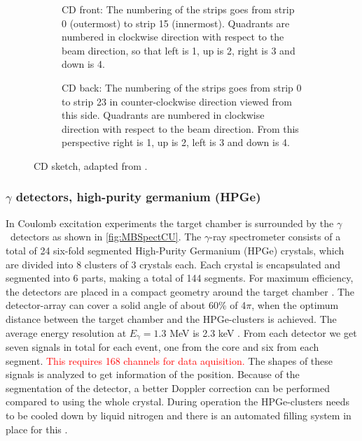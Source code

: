 \documentclass[twoside,english]{uiofysmaster/uiofysmaster}
\newcommand{\ga}{$\gamma$}
\begin{document}
\begin{figure}[ht]
	\centering
	\begin{subfigure}{\textwidth}
		
		\caption{CD front: The numbering of the strips goes from strip 0 (outermost) to strip 15 (innermost). Quadrants are numbered in clockwise direction with respect to the beam direction, so that left is 1, up is 2, right is 3 and down is 4.}
		\label{fig:CD-F}
	\end{subfigure}
	\begin{subfigure}{\textwidth}
		
		\caption{CD back: The numbering of the strips goes from strip 0 to strip 23 in counter-clockwise direction viewed from this side. Quadrants are numbered in clockwise direction with respect to the beam direction. From this perspective right is 1, up is 2, left is 3 and down is 4.}
		\label{fig:CD-B}
	\end{subfigure}
	\caption{CD sketch, adapted from \cite{NWarr-CD}.}
	\label{fig:CD-FB}
\end{figure}


\subsubsection{\texorpdfstring{$\gamma$}{Gamma} detectors, high-purity germanium (HPGe)}
In Coulomb excitation experiments the target chamber is surrounded by the \ga\ detectors as shown in \autoref{fig:MBSpectCU}. The \ga-ray spectrometer consists of a total of 24 six-fold segmented High-Purity Germanium (HPGe) crystals, which are divided into 8 clusters of 3 crystals each. Each crystal is encapsulated and segmented into 6 parts, making a total of 144 segments. For maximum efficiency, the detectors are placed in a compact geometry around the target chamber \cite{NWarr-HPGe, MB-spect}. The detector-array can cover a solid angle of about 60\% of 4$\pi$, when the optimum distance between the target chamber and the HPGe-clusters is achieved. The average energy resolution at $E_\gamma = 1.3$ MeV is 2.3 keV \cite{Butler2017}. From each detector we get seven signals in total for each event, one from the core and six from each segment. \textcolor{red}{This requires 168 channels for data aquisition.} The shapes of these signals is analyzed to get information of the position. Because of the segmentation of the detector, a better Doppler correction can be performed compared to using the whole crystal. During operation the HPGe-clusters needs to be cooled down by liquid nitrogen and there is an automated filling system in place for this \cite{NWarr-HPGe}. 
\end{document}
